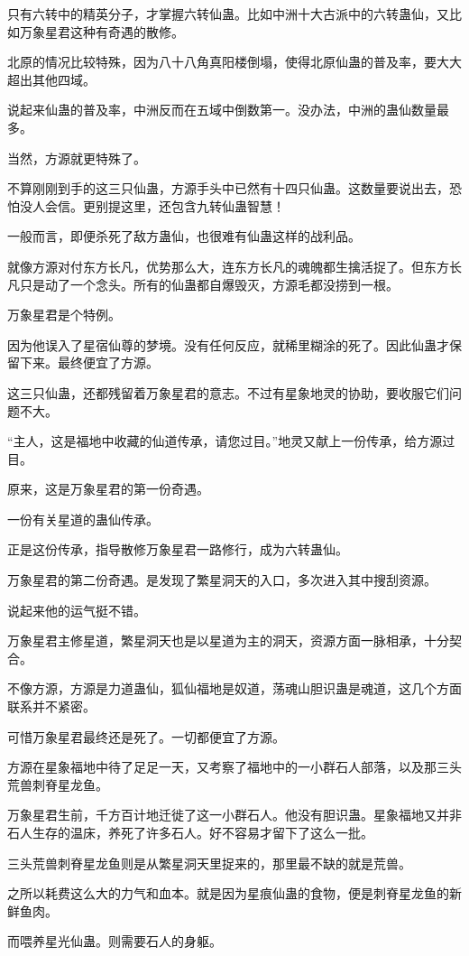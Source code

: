 \begin{this_body}
只有六转中的精英分子，才掌握六转仙蛊。比如中洲十大古派中的六转蛊仙，又比如万象星君这种有奇遇的散修。

北原的情况比较特殊，因为八十八角真阳楼倒塌，使得北原仙蛊的普及率，要大大超出其他四域。

说起来仙蛊的普及率，中洲反而在五域中倒数第一。没办法，中洲的蛊仙数量最多。

当然，方源就更特殊了。

不算刚刚到手的这三只仙蛊，方源手头中已然有十四只仙蛊。这数量要说出去，恐怕没人会信。更别提这里，还包含九转仙蛊智慧！

一般而言，即便杀死了敌方蛊仙，也很难有仙蛊这样的战利品。

就像方源对付东方长凡，优势那么大，连东方长凡的魂魄都生擒活捉了。但东方长凡只是动了一个念头。所有的仙蛊都自爆毁灭，方源毛都没捞到一根。

万象星君是个特例。

因为他误入了星宿仙尊的梦境。没有任何反应，就稀里糊涂的死了。因此仙蛊才保留下来。最终便宜了方源。

这三只仙蛊，还都残留着万象星君的意志。不过有星象地灵的协助，要收服它们问题不大。

“主人，这是福地中收藏的仙道传承，请您过目。”地灵又献上一份传承，给方源过目。

原来，这是万象星君的第一份奇遇。

一份有关星道的蛊仙传承。

正是这份传承，指导散修万象星君一路修行，成为六转蛊仙。

万象星君的第二份奇遇。是发现了繁星洞天的入口，多次进入其中搜刮资源。

说起来他的运气挺不错。

万象星君主修星道，繁星洞天也是以星道为主的洞天，资源方面一脉相承，十分契合。

不像方源，方源是力道蛊仙，狐仙福地是奴道，荡魂山胆识蛊是魂道，这几个方面联系并不紧密。

可惜万象星君最终还是死了。一切都便宜了方源。

方源在星象福地中待了足足一天，又考察了福地中的一小群石人部落，以及那三头荒兽刺脊星龙鱼。

万象星君生前，千方百计地迁徙了这一小群石人。他没有胆识蛊。星象福地又并非石人生存的温床，养死了许多石人。好不容易才留下了这么一批。

三头荒兽刺脊星龙鱼则是从繁星洞天里捉来的，那里最不缺的就是荒兽。

之所以耗费这么大的力气和血本。就是因为星痕仙蛊的食物，便是刺脊星龙鱼的新鲜鱼肉。

而喂养星光仙蛊。则需要石人的身躯。


\end{this_body}
